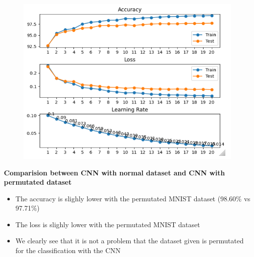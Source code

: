 \documentclass[10pt,a4paper,fullpage]{article}
\begin{document}
\begin{figure}[H]
	\begin{center}
		\includegraphics[scale=1]{cnn_model_plot_permutated.png}
	\end{center}
\end{figure}


\textbf{Comparision between CNN with normal dataset and CNN with permutated dataset}
\begin{itemize}
	\item The accuracy is slighly lower with the permutated MNIST dataset (98.60\% vs 97.71\%)
	\item The loss is slighly lower with the permutated MNIST dataset
	\item We clearly see that it is not a problem that the dataset given is permutated for the classification with the CNN 
\end{itemize}
\end{document}
